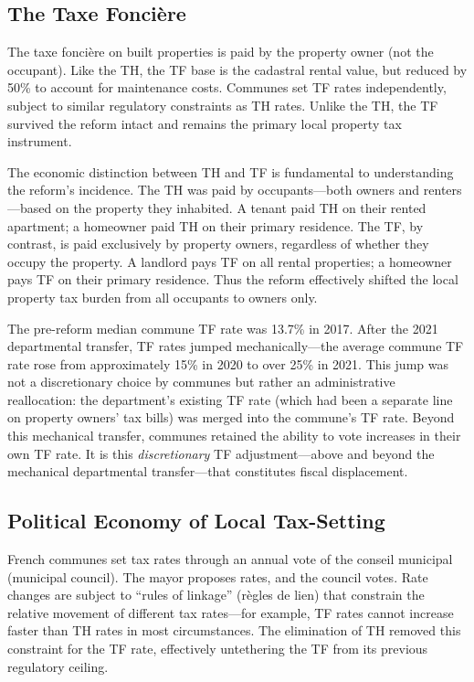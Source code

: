 \documentclass[12pt]{article}
\begin{document}
\subsection{The Taxe Fonci\`ere}

The taxe fonci\`ere on built properties is paid by the property owner (not the occupant). Like the TH, the TF base is the cadastral rental value, but reduced by 50\% to account for maintenance costs. Communes set TF rates independently, subject to similar regulatory constraints as TH rates. Unlike the TH, the TF survived the reform intact and remains the primary local property tax instrument.

The economic distinction between TH and TF is fundamental to understanding the reform's incidence. The TH was paid by occupants---both owners and renters---based on the property they inhabited. A tenant paid TH on their rented apartment; a homeowner paid TH on their primary residence. The TF, by contrast, is paid exclusively by property owners, regardless of whether they occupy the property. A landlord pays TF on all rental properties; a homeowner pays TF on their primary residence. Thus the reform effectively shifted the local property tax burden from all occupants to owners only.

The pre-reform median commune TF rate was 13.7\% in 2017. After the 2021 departmental transfer, TF rates jumped mechanically---the average commune TF rate rose from approximately 15\% in 2020 to over 25\% in 2021. This jump was not a discretionary choice by communes but rather an administrative reallocation: the department's existing TF rate (which had been a separate line on property owners' tax bills) was merged into the commune's TF rate. Beyond this mechanical transfer, communes retained the ability to vote increases in their own TF rate. It is this \emph{discretionary} TF adjustment---above and beyond the mechanical departmental transfer---that constitutes fiscal displacement.

\subsection{Political Economy of Local Tax-Setting}

French communes set tax rates through an annual vote of the conseil municipal (municipal council). The mayor proposes rates, and the council votes. Rate changes are subject to ``rules of linkage'' (r\`egles de lien) that constrain the relative movement of different tax rates---for example, TF rates cannot increase faster than TH rates in most circumstances. The elimination of TH removed this constraint for the TF rate, effectively untethering the TF from its previous regulatory ceiling.
\end{document}
